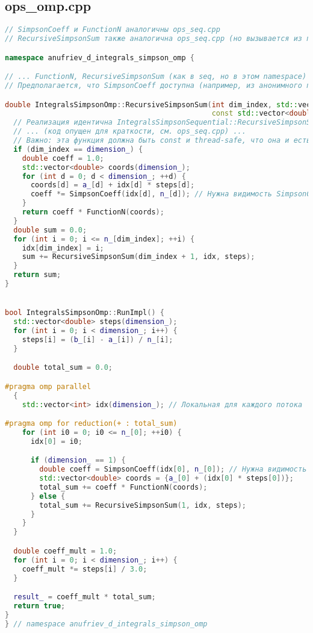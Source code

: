 \documentclass[a4paper,12pt]{article}
\begin{document}
\newpage
\subsection{ops\_omp.cpp}
\begin{lstlisting}[language=C++, caption=Функция RunImpl из ops\_omp.cpp, basicstyle=\ttfamily\tiny]
// SimpsonCoeff и FunctionN аналогичны ops_seq.cpp
// RecursiveSimpsonSum также аналогична ops_seq.cpp (но вызывается из параллельного контекста)

namespace anufriev_d_integrals_simpson_omp {

// ... FunctionN, RecursiveSimpsonSum (как в seq, но в этом namespace) ...
// Предполагается, что SimpsonCoeff доступна (например, из анонимного пространства имен выше)

double IntegralsSimpsonOmp::RecursiveSimpsonSum(int dim_index, std::vector<int>& idx,
                                                const std::vector<double>& steps) const {
  // Реализация идентична IntegralsSimpsonSequential::RecursiveSimpsonSum
  // ... (код опущен для краткости, см. ops_seq.cpp) ...
  // Важно: эта функция должна быть const и thread-safe, что она и есть.
  if (dim_index == dimension_) {
    double coeff = 1.0;
    std::vector<double> coords(dimension_);
    for (int d = 0; d < dimension_; ++d) {
      coords[d] = a_[d] + idx[d] * steps[d];
      coeff *= SimpsonCoeff(idx[d], n_[d]); // Нужна видимость SimpsonCoeff
    }
    return coeff * FunctionN(coords);
  }
  double sum = 0.0;
  for (int i = 0; i <= n_[dim_index]; ++i) {
    idx[dim_index] = i;
    sum += RecursiveSimpsonSum(dim_index + 1, idx, steps);
  }
  return sum;
}


bool IntegralsSimpsonOmp::RunImpl() {
  std::vector<double> steps(dimension_);
  for (int i = 0; i < dimension_; i++) {
    steps[i] = (b_[i] - a_[i]) / n_[i];
  }

  double total_sum = 0.0;

#pragma omp parallel
  {
    std::vector<int> idx(dimension_); // Локальная для каждого потока

#pragma omp for reduction(+ : total_sum)
    for (int i0 = 0; i0 <= n_[0]; ++i0) {
      idx[0] = i0;

      if (dimension_ == 1) {
        double coeff = SimpsonCoeff(idx[0], n_[0]); // Нужна видимость SimpsonCoeff
        std::vector<double> coords = {a_[0] + (idx[0] * steps[0])};
        total_sum += coeff * FunctionN(coords);
      } else {
        total_sum += RecursiveSimpsonSum(1, idx, steps);
      }
    }
  }

  double coeff_mult = 1.0;
  for (int i = 0; i < dimension_; i++) {
    coeff_mult *= steps[i] / 3.0;
  }

  result_ = coeff_mult * total_sum;
  return true;
}
} // namespace anufriev_d_integrals_simpson_omp
\end{lstlisting}
\end{document}
